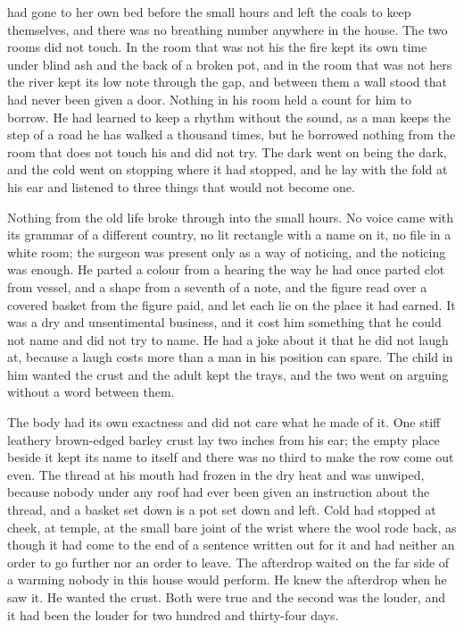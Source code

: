  had gone to her own bed before the small hours and left the coals to keep themselves, and there was no breathing number anywhere in the house. The two rooms did not touch. In the room that was not his the fire kept its own time under blind ash and the back of a broken pot, and in the room that was not hers the river kept its low note through the gap, and between them a wall stood that had never been given a door. Nothing in his room held a count for him to borrow. He had learned to keep a rhythm without the sound, as a man keeps the step of a road he has walked a thousand times, but he borrowed nothing from the room that does not touch his and did not try. The dark went on being the dark, and the cold went on stopping where it had stopped, and he lay with the fold at his ear and listened to three things that would not become one.

Nothing from the old life broke through into the small hours. No voice came with its grammar of a different country, no lit rectangle with a name on it, no file in a white room; the surgeon was present only as a way of noticing, and the noticing was enough. He parted a colour from a hearing the way he had once parted clot from vessel, and a shape from a seventh of a note, and the figure read over a covered basket from the figure paid, and let each lie on the place it had earned. It was a dry and unsentimental business, and it cost him something that he could not name and did not try to name. He had a joke about it that he did not laugh at, because a laugh costs more than a man in his position can spare. The child in him wanted the crust and the adult kept the trays, and the two went on arguing without a word between them.

The body had its own exactness and did not care what he made of it. One stiff leathery brown-edged barley crust lay two inches from his ear; the empty place beside it kept its name to itself and there was no third to make the row come out even. The thread at his mouth had frozen in the dry heat and was unwiped, because nobody under any roof had ever been given an instruction about the thread, and a basket set down is a pot set down and left. Cold had stopped at cheek, at temple, at the small bare joint of the wrist where the wool rode back, as though it had come to the end of a sentence written out for it and had neither an order to go further nor an order to leave. The afterdrop waited on the far side of a warming nobody in this house would perform. He knew the afterdrop when he saw it. He wanted the crust. Both were true and the second was the louder, and it had been the louder for two hundred and thirty-four days.

